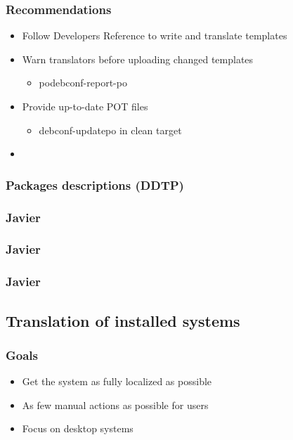 \documentclass{beamer}
\begin{document}
\begin{frame}
  \frametitle{Recommendations}
	\begin{itemize}
	\item
		Follow Developers Reference to write and translate templates
	\item
		Warn translators before uploading changed templates
		\begin{itemize}
		\item
			podebconf-report-po
		\end{itemize}
	\item
		Provide up-to-date POT files
		\begin{itemize}
		\item
			debconf-updatepo in clean target
		\end{itemize}
	\item
	\end{itemize}
\end{frame}

\subsubsection{Packages descriptions (DDTP)}

\begin{frame}
  \frametitle{Javier}
\end{frame}

\begin{frame}
  \frametitle{Javier}
\end{frame}

\begin{frame}
  \frametitle{Javier}
\end{frame}

\subsection{Translation of installed systems}

\begin{frame}
  \frametitle{Goals}
	\begin{itemize}
	\item
		Get the system as fully localized as possible
	\item
		As few manual actions as possible for users
	\item
		Focus on desktop systems
	\end{itemize}
\end{frame}
\end{document}
